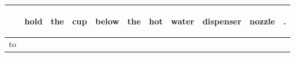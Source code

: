 \documentclass[landscape]{article}
\newcommand{\ssp}{\hspace{2pt}}
\begin{document}
\newpage

\noindent\begin{tabular}{|l|p{10pt}|p{10pt}|p{10pt}|p{10pt}|p{10pt}|p{10pt}|p{10pt}|p{10pt}|p{10pt}|p{10pt}|}
\hline
&\begin{sideways}\cellcolor{ref0}hold\hspace{12pt}\end{sideways}&\begin{sideways}\cellcolor{ref1}the\hspace{12pt}\end{sideways}&\begin{sideways}\cellcolor{ref2}cup\hspace{12pt}\end{sideways}&\begin{sideways}\cellcolor{ref3}below\hspace{12pt}\end{sideways}&\begin{sideways}\cellcolor{ref4}the\hspace{12pt}\end{sideways}&\begin{sideways}\cellcolor{ref5}hot\hspace{12pt}\end{sideways}&\begin{sideways}\cellcolor{ref6}water\hspace{12pt}\end{sideways}&\begin{sideways}\cellcolor{ref7}dispenser\hspace{12pt}\end{sideways}&\begin{sideways}\cellcolor{ref8}nozzle\hspace{12pt}\end{sideways}&\begin{sideways}\cellcolor{ref9}.\hspace{12pt}\end{sideways}\\
\hline
\ssp to \ssp&\hspace{2pt}&\hspace{2pt}&\hspace{2pt}&\hspace{2pt}&\hspace{2pt}&\hspace{2pt}&\hspace{2pt}&\hspace{2pt}&\hspace{2pt}&\hspace{2pt}\\

\end{tabular}
\end{document}
